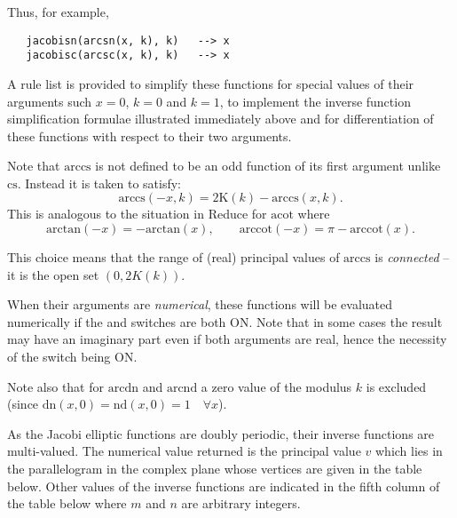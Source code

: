 Thus, for example,
\begin{verbatim}
   jacobisn(arcsn(x, k), k)   --> x
   jacobisc(arcsc(x, k), k)   --> x
\end{verbatim}

A rule list is provided to simplify these functions for special values of their
arguments such $x=0$, $k=0$ and $k=1$, to implement the inverse function
simplification formulae illustrated immediately above and for differentiation
of these functions with respect to their two arguments.

Note that $\mathrm{arccs}$ is not defined to be an odd
function of its first argument unlike $\mathrm{cs}$.
Instead it is taken to satisfy:
\[ \mathrm{arccs}(-x, k) = 2\mathrm{K}(k)-\mathrm{arccs}(x, k).\]
This is analogous to the situation in Reduce for $\mathrm{acot}$ where
\[ \mathrm{arctan}(-x) = -\mathrm{arctan}(x),\qquad
  \mathrm{arccot}(-x) = \pi -\mathrm{arccot}(x). \]

This choice means that the range of (real) principal values of
$\mathrm{arccs}$ is \emph{connected} -- it is the open set $(0, 2K(k))$.

When their arguments are \emph{numerical}, these functions will be
evaluated numerically if the  and  switches are
both ON.  Note that in some cases the result may have an imaginary
part even if both arguments are real, hence the necessity of the switch
 being ON.

Note also that for $\mathrm{arcdn}$ and $\mathrm{arcnd}$ a zero value of
the modulus $k$ is excluded (since
$\mathrm{dn}(x,0) = \mathrm{nd}(x,0) = 1 \quad \forall x$).

As the Jacobi elliptic functions are doubly periodic, their inverse functions
are multi-valued. The numerical value returned is the principal value $v$ which
lies in the parallelogram in the complex plane whose vertices are given in the
table below. Other values of the inverse functions are indicated in the
fifth column of the table below where $m$ and $n$ are arbitrary integers.

